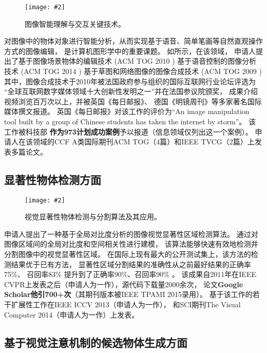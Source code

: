\documentclass[12pt]{article}
\newcommand{\addImg}[2][1.0]{\texttt{[image: \#2]}}
\newcommand{\myEmph}[1]{\textbf{\textcolor[rgb]{0,0,0.25}{#1}}}
\begin{document}
\begin{figure}[ht]
    \centering
    \addImg[1]{figures/work.jpg}
    \caption{图像智能理解与交互关键技术。}
    \label{fig:interaction}
\end{figure}

对图像中的物体对象进行智能分析，从而实现基于语音、简单笔画等自然直观操作方式的图像编辑，
是计算机图形学中的重要课题。
如所示，在该领域，
申请人提出了基于图像场景物体的编辑技术
(ACM TOG 2010 )%
基于语音控制的图像分析技术 
(ACM TOG 2014 )%
基于草图和网络图像的图像合成技术
(ACM TOG 2009 )%
其中，图像合成技术于2010年被法国政府参与组织的国际互联网行业论坛评选为
“全球互联网数字媒体领域十大创新性发明之一”并在法国参议院颁奖，
成果介绍视频浏览百万次以上，并被英国《每日邮报》、
德国《明镜周刊》等多家著名国际媒体撰文报道。
英国《每日邮报》对该工作的评价为“An image manipulation tool built by a group 
of Chinese students has taken the internet by storm”。
该工作被科技部 %
\myEmph{作为973计划成功案例}予以报道（信息领域仅列出这一个案例）。
申请人在该领域的CCF A类国际期刊ACM TOG（4篇）和IEEE TVCG（2篇）上发表多篇论文。

\subsection{显著性物体检测方面}

\begin{figure}[ht]
    \centering
    \addImg[1]{figures/sal.jpg}
    \caption{视觉显著性物体检测与分割算法及其应用。}
    \label{fig:salobj}
\end{figure}

申请人提出了一种基于全局对比度分析的图像视觉显著性区域检测算法。
通过对图像区域间的全局对比度和空间相关性进行建模，
该算法能够快速有效地检测并分割图像中的视觉显著性区域。
在国际上现有最大的公开测试集上，该方法的检测结果优于已有方法，
显著性区域分割结果的准确性从之前最好结果的正确率75\%、
召回率83\% 提升到了正确率90\%、召回率90\% 。
该成果自2011年在IEEE CVPR上发表之后（申请人为一作），源代码下载量2000余次，
论文\myEmph{Google Scholar他引700+次}（其期刊版本被IEEE TPAMI 2015录用）。
基于该工作的若干扩展性工作在IEEE ICCV 2013（申请人为一作），
和SCI期刊The Visual Computer 2014（申请人为一作）上发表。


\subsection{基于视觉注意机制的候选物体生成方面}
\end{document}
